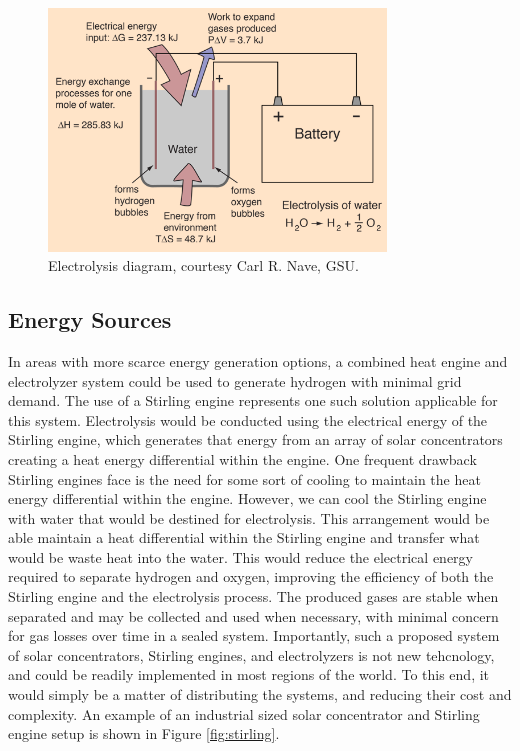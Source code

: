 \documentclass[conf]{new-aiaa}
\begin{document}
\begin{figure}[H]
    \centering
    \includegraphics[width=0.8\textwidth]{Figures/GSU.PNG}
    \caption{Electrolysis diagram, courtesy Carl R. Nave, GSU. \cite{GSU}}
    \label{fig:electro}
\end{figure}



\subsection{Energy Sources}
In areas with more scarce energy generation options, a combined heat engine and electrolyzer system could be used to generate hydrogen with minimal grid demand. The use of a Stirling engine represents one such solution applicable for this system. Electrolysis would be conducted using the electrical energy of the Stirling engine, which generates that energy from an array of solar concentrators creating a heat energy differential within the engine. One frequent drawback Stirling engines face is the need for some sort of cooling to maintain the heat energy differential within the engine. However, we can cool the Stirling engine with water that would be destined for electrolysis. This arrangement would be able maintain a heat differential within the Stirling engine and transfer what would be waste heat into the water. This would reduce the electrical energy required to separate hydrogen and oxygen, improving the efficiency of both the Stirling engine and the electrolysis process. The produced gases are stable when separated and may be collected and used when necessary, with minimal concern for gas losses over time in a sealed system. Importantly, such a proposed system of solar concentrators, Stirling engines, and electrolyzers is not new tehcnology, and could be readily implemented in most regions of the world. To this end, it would simply be a matter of distributing the systems, and reducing their cost and complexity. An example of an industrial sized solar concentrator and Stirling engine setup is shown in Figure \ref{fig:stirling}.
\end{document}
